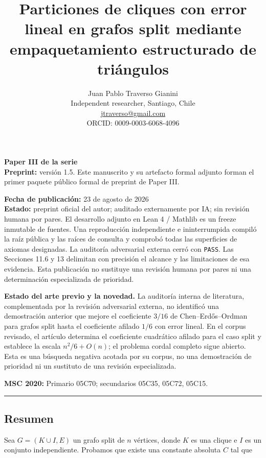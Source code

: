 \documentclass[
  spanish,
  11pt,
  a4paper,
]{article}
\title{Particiones de cliques con error lineal en grafos split mediante empaquetamiento estructurado de triángulos}
\author{Juan Pablo Traverso Gianini\\
\small Independent researcher, Santiago, Chile\\
\small \href{mailto:jtraverso@gmail.com}{jtraverso@gmail.com}\\
\small ORCID: 0009-0003-6068-4096}
\date{}
\begin{document}
\sloppy
\raggedbottom
\maketitle

\textbf{Paper III de la serie}\\
\textbf{Preprint:} versión 1.5. Este manuscrito y su artefacto formal adjunto forman el primer paquete público formal de preprint de Paper III.

\textbf{Fecha de publicación:} 23 de agosto de 2026\\
\textbf{Estado:} preprint oficial del autor; auditado externamente por IA; sin revisión humana por pares. El desarrollo adjunto en Lean 4 / Mathlib es un freeze inmutable de fuentes. Una reproducción independiente e ininterrumpida compiló la raíz pública y las raíces de consulta y comprobó todas las superficies de axiomas designadas. La auditoría adversarial externa cerró con \texttt{PASS}. Las Secciones 11.6 y 13 delimitan con precisión el alcance y las limitaciones de esa evidencia. Esta publicación no sustituye una revisión humana por pares ni una determinación especializada de prioridad.

\textbf{Estado del arte previo y la novedad.} La auditoría interna de literatura, complementada por la revisión adversarial externa, no identificó una demostración anterior que mejore el coeficiente \(3/16\) de Chen--Erdős--Ordman para grafos split hasta el coeficiente afilado \(1/6\) con error lineal. En el corpus revisado, el artículo determina el coeficiente cuadrático afilado para el caso split y establece la escala \(n^2/6+O(n)\); el problema cordal completo sigue abierto. Esta es una búsqueda negativa acotada por su corpus, no una demostración de prioridad ni un sustituto de una revisión especializada.

\textbf{MSC 2020:} Primario 05C70; secundarios 05C35, 05C72, 05C15.

\begin{center}\rule{0.5\linewidth}{0.5pt}\end{center}

\subsection{Resumen}\label{resumen}

Sea \(G=(K\cup I,E)\) un grafo split de \(n\) vértices, donde \(K\) es una clique e \(I\) es un conjunto independiente. Probamos que existe una constante absoluta \(C\) tal que
\end{document}

